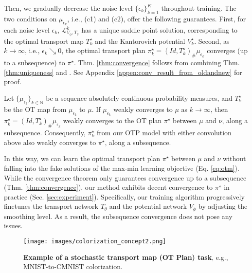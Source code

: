 Then, we gradually decrease the noise level $\{ \epsilon_{k} \}_{k=1}^{K}$ throughout training. The two conditions on $\mu_{\epsilon_{k}}$, i.e., (c1) and (c2), offer the following guarantees. First, for each noise level $\epsilon_{k}$, $\mathcal{L}^{k}_{V_{\phi}, T_{\theta}}$ has a unique saddle point solution, corresponding to the optimal transport map $T_{k}^{\star}$ and the Kantorovich potential $V_{k}^{\star}$. Second, as $k \rightarrow \infty$, i.e., $\epsilon_{k} \searrow 0$, the optimal transport plan $\pi^{\star}_{k} = (Id, T_k^{\star})_{\#} \mu_{\epsilon_{k}}$ converges (up to a subsequence) to $\pi^{\star}$. Thm. \ref{thm:convergence} follows from combining Thm. \ref{thm:uniqueness} and \citet{villani}. See Appendix \ref{appen:conv_result_from_oldandnew} for proof.

\begin{theorem} \label{thm:convergence}
    Let $\{\mu_{\epsilon_k}\}_{k\in \mathbb{N}}$ be a sequence absolutely continuous probability measures, and $T_{k}^{\star}$ be the OT map from $\mu_{\epsilon_k}$ to $\mu$.
     If $\mu_{\epsilon_k}$ weakly converges to $\mu$ as $k \to \infty$, then $\pi^{\star}_{k} = (Id, T_k^{\star})_{\#} \mu_{\epsilon_{k}}$ weakly converges to the OT plan $\pi^{\star}$ between $\mu$ and $\nu$, along a subsequence. Consequently, $\pi^{\star}_{k}$ from our OTP model with either convolution above also weakly converges to $\pi^{\star}$, along a subsequence.
\end{theorem}

In this way, we can learn the optimal transport plan $\pi^{\star}$ between $\mu$ and $\nu$ without falling into the fake solutions of the max-min learning objective (Eq. \ref{eq:otm}). While the convergence theorem only guarantees convergence up to a subsequence (Thm. \ref{thm:convergence}), our method exhibits decent convergence to $\pi^{\star}$ in practice (Sec. \ref{sec:experiment}). Specifically, our training algorithm progressively finetunes the transport network $T_{\theta}$ and the potential network $V_{\phi}$ by adjusting the smoothing level. As a result, the subsequence convergence does not pose any issues.

\begin{figure}[t]
    \centering
    \texttt{[image: images/colorization\_concept2.png]}
    \caption{
    \textbf{Example of a stochastic transport map (OT Plan) task}, e.g., MNIST-to-CMNIST colorization.}
    \vspace{-10pt}
    \label{fig:concept_m2cm}
\end{figure}

